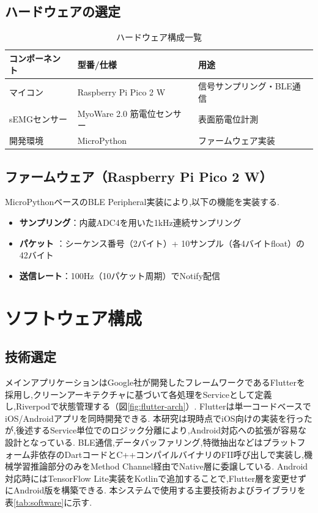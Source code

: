 \subsection{ハードウェアの選定}
\begin{table}[htbp]
\centering
\caption{ハードウェア構成一覧}
\label{tab:hardware}
\begin{tabular}{lll}
\hline
\textbf{コンポーネント} & \textbf{型番/仕様} & \textbf{用途} \\ \hline
マイコン & Raspberry Pi Pico 2 W & 信号サンプリング・BLE通信 \\
sEMGセンサー & MyoWare 2.0 筋電位センサー & 表面筋電位計測 \\
開発環境 & MicroPython & ファームウェア実装 \\ \hline
\end{tabular}
\end{table}

\subsection{ファームウェア（Raspberry Pi Pico 2 W）}
MicroPythonベースのBLE Peripheral実装により,以下の機能を実装する.

\begin{itemize}
\item \textbf{サンプリング}：内蔵ADC4を用いた1kHz連続サンプリング
\item \textbf{パケット}  ：シーケンス番号（2バイト）+ 10サンプル（各4バイトfloat）の42バイト
\item \textbf{送信レート}：100Hz（10パケット周期）でNotify配信
\end{itemize}

\pagebreak

\section{ソフトウェア構成}

\subsection{技術選定}
メインアプリケーションはGoogle社が開発したフレームワークであるFlutterを採用し,クリーンアーキテクチャに基づいて各処理をServiceとして定義し,Riverpodで状態管理する（図\ref{fig:flutter-arch}）.
Flutterは単一コードベースでiOS/Androidアプリを同時開発できる. 本研究は現時点でiOS向けの実装を行ったが,後述するService単位でのロジック分離により,Android対応への拡張が容易な設計となっている.
BLE通信,データバッファリング,特徴抽出などはプラットフォーム非依存のDartコードとC++コンパイルバイナリのFII呼び出しで実装し,機械学習推論部分のみをMethod Channel経由でNative層に委譲している.
Android対応時にはTensorFlow Lite実装をKotlinで追加することで,Flutter層を変更せずにAndroid版を構築できる.
本システムで使用する主要技術およびライブラリを表\ref{tab:software}に示す.

